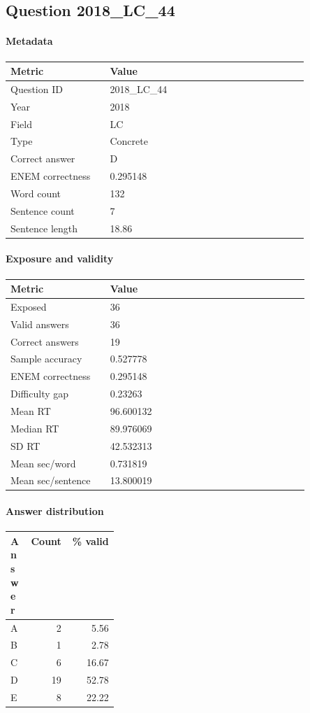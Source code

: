 \subsection*{Question 2018\_LC\_44}
\label{sec:q_2018_LC_44}
\paragraph{Metadata}
\begin{tabular}{p{0.30\linewidth}p{0.60\linewidth}}
\toprule
Metric & Value\\
\midrule
Question ID & 2018\_LC\_44\\
Year & 2018\\
Field & LC\\
Type & Concrete\\
Correct answer & D\\
ENEM correctness & 0.295148\\
Word count & 132\\
Sentence count & 7\\
Sentence length & 18.86\\
\bottomrule
\end{tabular}

\paragraph{Exposure and validity}
\begin{tabular}{p{0.30\linewidth}p{0.60\linewidth}}
\toprule
Metric & Value\\
\midrule
Exposed & 36\\
Valid answers & 36\\
Correct answers & 19\\
Sample accuracy & 0.527778\\
ENEM correctness & 0.295148\\
Difficulty gap & 0.23263\\
Mean RT & 96.600132\\
Median RT & 89.976069\\
SD RT & 42.532313\\
Mean sec/word & 0.731819\\
Mean sec/sentence & 13.800019\\
\bottomrule
\end{tabular}

\paragraph{Answer distribution}
\begin{tabular}{p{0.18\linewidth}rr}
\toprule
Answer & Count & \% valid\\
\midrule
A & 2 & 5.56\\
B & 1 & 2.78\\
C & 6 & 16.67\\
D & 19 & 52.78\\
E & 8 & 22.22\\
\bottomrule
\end{tabular}

